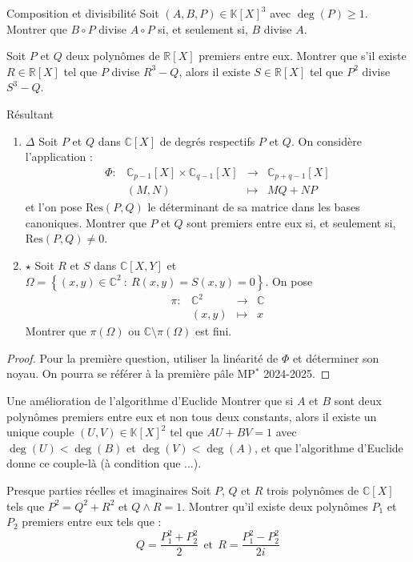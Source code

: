 \documentclass[french,a4paper]{article}
\newcommand{\R}{\mathbb{R}}
\newcommand{\C}{\mathbb{C}}
\newcommand{\K}{\mathbb{K}}
\newcommand{\st}{^*}
\theoremstyle{plain}
\theoremstyle{definition}
\theoremstyle{remark}
\begin{document}
\begin{ex}[Moulin.AG.67]{Composition et divisibilité}
	Soit $(A,B,P)\in\K[X]^3$ avec $\deg(P)\geqslant 1$. Montrer que $B\circ P$ divise $A\circ P$ si, et seulement si, $B$ divise $A$.
\end{ex}

\begin{ex}[Moulin.AG.68]{}
	Soit $P$ et $Q$ deux polynômes de $\R[X]$ premiers entre eux. Montrer que s'il existe $R\in\R[X]$ tel que $P$ divise $R^3-Q$, alors il existe $S\in\R[X]$ tel que $P^2$ divise $S^3-Q$.
\end{ex}

\begin{ex}[Moulin.AG.69]{Résultant}
	\begin{enumerate}
		\item $\Delta$ Soit $P$ et $Q$ dans $\C[X]$ de degrés respectifs $P$ et $Q$. On considère l'application : $$\begin{array}{lrcl}
			\Phi:&\C_{p-1}[X]\times\C_{q-1}[X]&\longrightarrow&\C_{p+q-1}[X]\\
			&(M,N)&\longmapsto&MQ+NP
		\end{array}$$ et l'on pose $\text{Res}(P,Q)$ le déterminant de sa matrice dans les bases canoniques. Montrer que $P$ et $Q$ sont premiers entre eux si, et seulement si, $\text{Res}(P,Q)\ne 0$.
		\item $\star$ Soit $R$ et $S$ dans $\C[X,Y]$ et $\Omega=\left\{(x,y)\in\C^2\ : \ R(x,y)=S(x,y)=0\right\}$. On pose $$\begin{array}{lrcl}
			\pi:&\C^2&\longrightarrow&\C\\
			&(x,y)&\longmapsto&x
		\end{array}$$ Montrer que $\pi(\Omega)$ ou $\C\setminus\pi(\Omega)$ est fini.
	\end{enumerate}
\end{ex}
\begin{proof}
	Pour la première question, utiliser la linéarité de $\Phi$ et déterminer son noyau. On  pourra se référer à la première pâle MP$\st$ 2024-2025.
\end{proof}

\begin{ex}[Moulin.AG.70]{Une amélioration de l'algorithme d'Euclide}
	Montrer que si $A$ et $B$ sont deux polynômes premiers entre eux et non tous deux constants, alors il existe un unique couple $(U,V)\in\K[X]^2$ tel que $AU+BV=1$ avec $\deg(U)<\deg(B)$ et $\deg(V)<\deg(A)$, et que l'algorithme d'Euclide donne ce couple-là (à condition que ...).
\end{ex}
\begin{ex}[Moulin.AG.71]{Presque parties réelles et imaginaires}
	Soit $P$, $Q$ et $R$ trois polynômes de $\C[X]$ tels que $P^2=Q^2+R^2$ et $Q\wedge R=1$. Montrer qu'il existe deux polynômes $P_1$ et $P_2$ premiers entre eux tels que : $$Q=\frac{P_1^2+P_2^2}{2}\ \ \text{et}\ \ R=\frac{P_1^2-P_2^2}{2i}$$
\end{ex}
\end{document}

